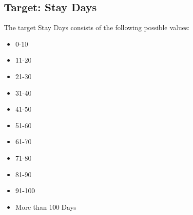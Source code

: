 \documentclass[fleqn]{article}
\begin{document}
		\subsection*{Target: Stay Days}
			
			The target Stay Days consists of the following possible values:\\
			
			\begin{itemize}
				\item 0-10
				\item 11-20
				\item 21-30
				\item 31-40 
				\item 41-50
				\item 51-60
				\item 61-70
				\item 71-80
				\item 81-90
				\item 91-100
				\item More than 100 Days   
			\end{itemize}
			
\end{document}
